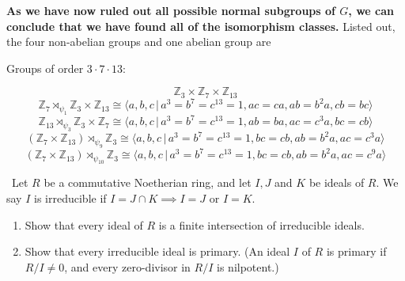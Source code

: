 \documentclass[12pt]{Qual}
\begin{document}
\begin{solution}
\begin{enumerate}[label=(\alph*)]
    \textbf{As we have now ruled out all possible normal subgroups of $G$, we can conclude that we have found all of the isomorphism classes.} Listed out, the four non-abelian groups and one abelian group are

    \begin{framed}
    Groups of order $3\cdot 7\cdot 13$:


    $$\mathbb{Z}_3\times\mathbb{Z}_7\times \mathbb{Z}_{13}$$
    \vspace{-0.25cm}
    $$\mathbb{Z}_7\rtimes_{\psi_1}\mathbb{Z}_3\times\mathbb{Z}_{13}\cong \langle a,b,c\,|\, a^3=b^7=c^{13}=1, ac=ca, ab=b^2a, cb=bc\rangle$$
    \vspace{-0.25cm}
    $$\mathbb{Z}_{13}\rtimes_{\psi_3}\mathbb{Z}_3\times\mathbb{Z}_{7}\cong\langle a,b,c\,|\, a^3=b^7=c^{13}=1, ab=ba, ac=c^3a, bc=cb\rangle$$
    \vspace{-0.35cm}
    $$(\mathbb{Z}_7\times \mathbb{Z}_{13})\rtimes_{\psi_9}\mathbb{Z}_3\cong\langle a,b,c\,|\, a^3=b^7=c^{13}=1, bc=cb, ab=b^2a, ac=c^3a\rangle$$
    \vspace{-0.38cm}
    $$(\mathbb{Z}_7\times \mathbb{Z}_{13})\rtimes_{\psi_{10}}\mathbb{Z}_3\cong\langle a,b,c\,|\, a^3=b^7=c^{13}=1, bc=cb, ab=b^2a, ac=c^9a\rangle$$
    \end{framed}
\end{enumerate}
\end{solution}
\newpage

\begin{problem} $\,$
Let $R$ be a commutative Noetherian ring, and let $I,J$ and $K$ be ideals of $R$. We say $I$ is irreducible if $I=J\cap K\implies I=J$ or $I=K$.
\begin{enumerate}[label=(\alph*)]
    \item Show that every ideal of $R$ is a finite intersection of irreducible ideals.
    \item Show that every irreducible ideal is primary. (An ideal $I$ of $R$ is primary if $R/I\not=0$, and every zero-divisor in $R/I$ is nilpotent.)
\end{enumerate}
\end{problem}
\end{document}
